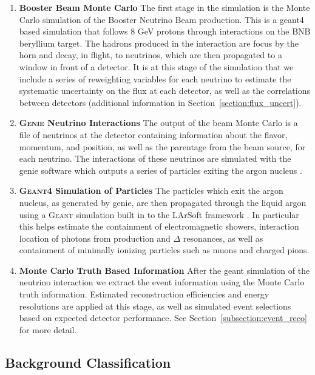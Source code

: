 \begin{enumerate}

  \item {\bf Booster Beam Monte Carlo} The first stage in the simulation is the Monte Carlo simulation of the Booster Neutrino Beam production. This is a geant4 based simulation that follows 8 GeV protons through interactions on the BNB beryllium target. The hadrons produced in the interaction are focus by the horn and decay, in flight, to neutrinos, which are then propagated to a window in front of a detector. It is at this stage of the simulation that we include a series of reweighting variables for each neutrino to estimate the systematic uncertainty on the flux at each detector, as well as the correlations between detectors (additional information in Section~\ref{section:flux_uncert}).

  \item {\bf \textsc{Genie} Neutrino Interactions} The output of the beam Monte Carlo is a file of neutrinos at the detector containing information about the flavor, momentum, and position, as well as the parentage from the beam source, for each neutrino. The interactions of these neutrinos are simulated with the genie software which outputs a series of particles exiting the argon nucleus \cite{Andreopoulos:2009rq}. 

  \item {\bf \textsc{Geant4} Simulation of Particles} The particles which exit the argon nucleus, as generated by genie, are then propagated through the liquid argon using a \textsc{Geant} \cite{Agostinelli:2002hh} simulation built in to the LArSoft framework \cite{Church:2013hea}. In particular this helps estimate the containment of electromagnetic showers, interaction location of photons from \pizero production and $\Delta$ resonances, as well as containment of minimally ionizing particles such as muons and charged pions.

  \item {\bf Monte Carlo Truth Based Information}  After the geant simulation of the neutrino interaction we extract the event information using the Monte Carlo truth information. Estimated reconstruction efficiencies and energy resolutions are applied at this stage, as well as simulated event selections based on expected detector performance.  See Section~\ref{subsection:event_reco} for more detail.

\end{enumerate}


\subsection{Background Classification}

